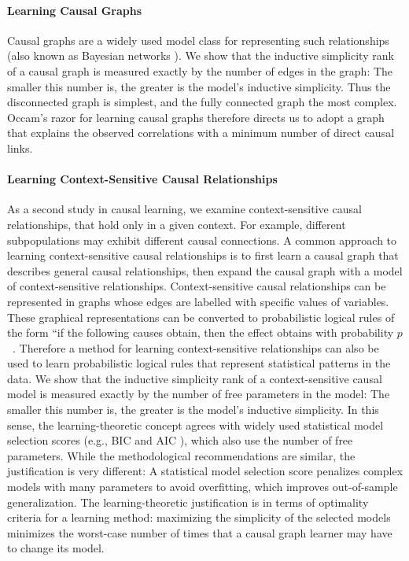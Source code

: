 \documentclass{elsarticle}%
\begin{document}
\paragraph{Learning Causal Graphs} Causal graphs are a widely used model class for representing such relationships (also known as Bayesian networks \cite{pearl88:_probab_reason_intel_system,pearl00:_causal,peter00:_causat}). We show that the inductive simplicity rank of a causal graph is measured exactly by the number of edges in the graph: The smaller this number is, the greater is the model's inductive simplicity. Thus the disconnected graph is simplest, and the fully connected graph the most complex. Occam's razor for learning causal graphs therefore directs us to adopt a graph that explains the observed correlations with a minimum number of direct causal links. 

\paragraph{Learning Context-Sensitive Causal Relationships} As a second study in causal learning, we examine context-sensitive causal relationships, that hold only in a given context. For example, different subpopulations may exhibit different causal connections. A common approach to learning context-sensitive causal relationships is to first learn a causal graph that describes general causal relationships, then expand the causal graph  with a model of context-sensitive relationships. Context-sensitive causal relationships can be represented in graphs whose edges are labelled with specific values of variables. These graphical representations can be converted to probabilistic logical rules of the form ``if the following causes obtain, then the effect obtains with probability $p$ ~\cite{Ngo1997}. Therefore a method for learning context-sensitive relationships can also be used to learn probabilistic logical rules that represent statistical patterns in the data. We show that the inductive simplicity rank of a context-sensitive causal model is measured exactly by the number of free parameters in the model: The smaller this number is, the greater is the model's inductive simplicity. In this sense, the learning-theoretic concept agrees with widely used statistical model selection scores (e.g., BIC and AIC \cite{Chickering2003}), which also use the number of free parameters. While the  methodological recommendations are similar, the justification is very different: A statistical model selection score penalizes complex models with many parameters to avoid overfitting, which improves out-of-sample generalization. The learning-theoretic justification is in terms of optimality criteria for a learning method: maximizing the simplicity of the selected models minimizes the worst-case number of times that a causal graph learner may have to change its model.
\end{document}
